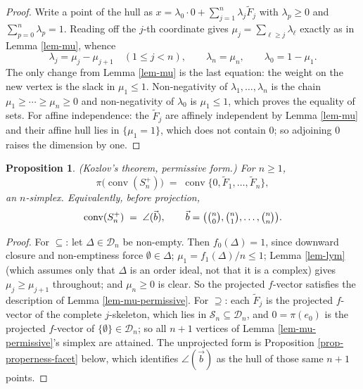 \documentclass[11pt, a4paper, abstract=yes]{scrartcl}
\theoremstyle{definition}
\theoremstyle{remark}
\theoremstyle{plain}
\newtheorem{proposition}[definition]{Proposition}
\newcommand{\rasimp}{\angle}
\newcommand{\proj}{\pi}
\newcommand{\leandiscof}[1]{\tikz[baseline=-0.6ex]\fill[#1] (0,0) circle (0.6ex);}
\newcommand{\leanfull}{\leandiscof{leanfull}}
\newcommand{\leanmark}[1]{\leavevmode{\reversemarginpar\marginnote{\raggedleft#1}}}
\newcommand{\conv}{\operatorname{conv}}
\begin{document}
\begin{proof}
Write a point of the hull as \(x=\lambda_0\cdot0+\sum_{j=1}^n\lambda_j\tilde F_j\) with
\(\lambda_p\ge0\) and \(\sum_{p=0}^n\lambda_p=1\). Reading off the \(j\)-th coordinate gives
\(\mu_j=\sum_{\ell\ge j}\lambda_\ell\) exactly as in Lemma \ref{lem-mu}, whence
\begin{equation}\label{eq:mu-permissive-2}
  \lambda_j=\mu_j-\mu_{j+1}\quad(1\le j<n),\qquad \lambda_n=\mu_n,\qquad
  \lambda_0=1-\mu_1 .
\end{equation}
The only change from Lemma \ref{lem-mu} is the last equation: the weight on the new vertex is the slack
in \(\mu_1\le1\). Non-negativity of \(\lambda_1,\dots,\lambda_n\) is the chain
\(\mu_1\ge\cdots\ge\mu_n\ge0\) and non-negativity of \(\lambda_0\) is \(\mu_1\le1\), which proves the
equality of sets. For affine independence: the \(\tilde F_j\) are affinely independent by
Lemma \ref{lem-mu} and their affine hull lies in \(\lbrace\mu_1=1\rbrace\), which does not contain
\(0\); so adjoining \(0\) raises the dimension by one.
\end{proof}

\begin{proposition}
\leanmark{\leanfull}(\emph{Kozlov's theorem, permissive form.}) For \(n\ge1\),
\begin{equation}\label{eq:permissive-hull}
  \proj\bigl(\conv(S_n^{+})\bigr)\;=\;\conv\lbrace0,\tilde F_1,\dots,\tilde F_n\rbrace ,
\end{equation}
an \(n\)-simplex. Equivalently, before projection,
\begin{equation}\label{eq:permissive-hull-incl}
  \conv(S_n^{+})\;=\;\rasimp(\vec b),\qquad
  \vec b=\bigl(\tbinom n0,\tbinom n1,\dots,\tbinom nn\bigr).
\end{equation}
\label{prop:permissive-hull}
\label{prop-permissive-hull}
\end{proposition}

\begin{proof}
For \(\subseteq\): let \(\Delta\in\mathcal D_n\) be non-empty. Then \(f_0(\Delta)=1\), since downward
closure and non-emptiness force \(\emptyset\in\Delta\); \(\mu_1=f_1(\Delta)/n\le1\); Lemma
\ref{lem-lym} (which assumes only that \(\Delta\) is an order ideal, not that it is a complex)
gives \(\mu_j\ge\mu_{j+1}\) throughout; and \(\mu_n\ge0\) is clear. So the projected \(f\)-vector
satisfies the description of Lemma \ref{lem-mu-permissive}. For \(\supseteq\): each \(\tilde F_j\) is
the projected \(f\)-vector of the complete \(j\)-skeleton, which lies in \(\mathcal S_n\subseteq
\mathcal D_n\), and \(0=\proj(e_0)\) is the projected \(f\)-vector of
\(\lbrace\emptyset\rbrace\in\mathcal D_n\); so all \(n+1\) vertices of Lemma
\ref{lem-mu-permissive}'s simplex are attained. The unprojected form is Proposition
\ref{prop-properness-facet} below, which identifies \(\rasimp(\vec b)\) as the hull of those same
\(n+1\) points.
\end{proof}
\end{document}
